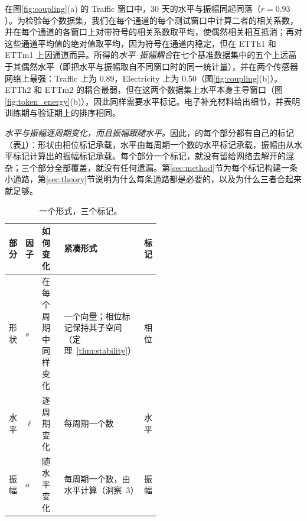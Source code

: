 {
在图\ref{fig:coupling}(a) 的 Traffic 窗口中，30 天的水平与振幅同起同落（$r=0.93$）。为检验每个数据集，我们在每个通道的每个测试窗口中计算二者的相关系数，并在每个通道的各窗口上对带符号的相关系数取平均，使偶然相关相互抵消；再对这些通道平均值的绝对值取平均，因为符号在通道内稳定，但在 ETTh1 和 ETTm1 上因通道而异。所得的\emph{水平–振幅耦合}在七个基准数据集中的五个上远高于其偶然水平（即把水平与振幅取自不同窗口时的同一统计量），并在两个传感器网络上最强：Traffic 上为 0.89，Electricity 上为 0.50（图\ref{fig:coupling}(b)）。ETTh2 和 ETTm2 的耦合最弱，但在这两个数据集上水平本身主导窗口（图\ref{fig:token_energy}(b)），因此同样需要水平标记。电子补充材料给出细节，并表明训练期与验证期上的排序相同。

\emph{水平与振幅逐周期变化，而且振幅跟随水平。}因此，的每个部分都有自己的标记（表\ref{tab:three_tokens}）：形状由相位标记承载，水平由每周期一个数的水平标记承载，振幅由从水平标记计算出的振幅标记承载。每个部分一个标记，就没有留给网络去解开的混杂；三个部分全部覆盖，就没有任何遗漏。第\ref{sec:method}节为每个标记构建一条小通路，第\ref{sec:theory}节说明为什么每条通路都是必要的，以及为什么三者合起来就足够。

\begin{table}[t]
\centering
\caption{一个形式，三个标记。}
\label{tab:three_tokens}
\footnotesize
\setlength{\tabcolsep}{2.5pt}
\begin{tabular}{@{}l l p{0.2\linewidth} p{0.31\linewidth} l@{}}
\toprule
部分 & 因子 & 如何变化 & 紧凑形式 & 标记 \\
\midrule
形状 & $s$ & 在每个周期中同样变化 & 一个向量；相位标记保持其子空间（定理~\ref{thm:stability}） & 相位 \\
水平 & $\ell$ & 逐周期变化 & 每周期一个数 & 水平 \\
振幅 & $a$ & 随水平变化 & 每周期一个数，由水平计算（洞察~3） & 振幅 \\
\bottomrule
\end{tabular}
\end{table}
}
